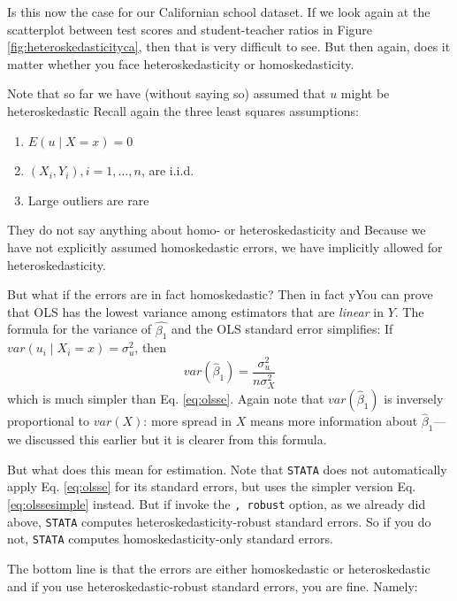 \documentclass[
]{book}
\providecommand{\tightlist}{%
  \setlength{\itemsep}{0pt}\setlength{\parskip}{0pt}}
\begin{document}
Is this now the case for our Californian school dataset. If we look again at the scatterplot between test scores and student-teacher ratios in Figure \ref{fig:heteroskedasticityca}, then that is very difficult to see. But then again, does it matter whether you face heteroskedasticity or homoskedasticity.

Note that so far we have (without saying so) assumed that \(u\) might be heteroskedastic
Recall again the three least squares assumptions:

\begin{enumerate}
\def\labelenumi{\arabic{enumi}.}
\tightlist
\item
  \(E(u \mid X = x) = 0\)
\item
  \((X_i,Y_i), i =1,\ldots,n\), are i.i.d.
\item
  Large outliers are rare
\end{enumerate}

They do not say anything about homo- or heteroskedasticity and Because we have not explicitly assumed homoskedastic errors, we have implicitly allowed for heteroskedasticity.

But what if the errors are in fact homoskedastic? Then in fact yYou can prove that OLS has the lowest variance among estimators that are \emph{linear} in \(Y\). The formula for the variance of \(\hat{\beta_1}\) and the OLS standard error simplifies: If \(var(u_i \mid X_i=x) = \sigma_u^2\), then
\begin{equation}
    var(\hat{\beta}_1) = \frac{\sigma_u^2}{n\sigma_X^2}
    \label{eq:olssesimple}
\end{equation}
which is much simpler than Eq. \eqref{eq:olsse}. Again note that \(var(\hat{\beta}_1)\) is inversely proportional to \(var(X)\): more spread in \(X\) means more information about \(\hat{\beta}_1\)---we discussed this earlier but it is clearer from this formula.

But what does this mean for estimation. Note that \texttt{STATA} does not automatically apply Eq. \eqref{eq:olsse} for its standard errors, but uses the simpler version Eq. \eqref{eq:olssesimple} instead. But if invoke the \texttt{,\ robust} option, as we already did above, \texttt{STATA} computes heteroskedasticity-robust standard errors. So if you do not, \texttt{STATA} computes homoskedasticity-only standard errors.

The bottom line is that the errors are either homoskedastic or heteroskedastic and if you use heteroskedastic-robust standard errors, you are fine. Namely:
\end{document}
